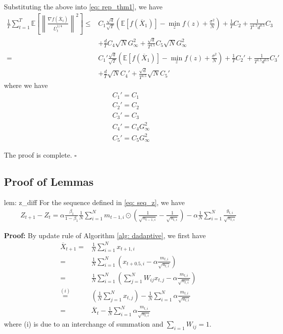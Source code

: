 \documentclass{article} %
\begin{document}
Substituting the above into \eqref{eq: rep_thm1}, we have 
\begin{align}\label{eq: sub_thm1}
\frac{1}{T}\sum_{t=1}^T  \mathbb E \left [\left\|\frac{\nabla f( \overline X_{t})}{\overline U_{t}^{1/4}}\right\|^2  \right]
\leq  & C_1 \frac{\sqrt{d}}{\sqrt{T}} \left(\mathbb E  [f( \overline X_{1})]  - \min_{z} f(z)  + \frac{\sigma^2}{N}\right)  +  \frac{ 1}{T} C_2    + \frac{1}{T^{1.5}d^{0.5}} C_3 \nonumber \\ 
&+   \frac{d}{T } C_4 \sqrt{N} G_{\infty}^2  + \frac{\sqrt{d}}{T^{1.5} } C_5  \sqrt{N} G_{\infty}^2 \nonumber \\
=  & C_1' \frac{\sqrt{d}}{\sqrt{T}} \left(\mathbb E  [f( \overline X_{1})]  - \min_{z} f(z)  + \frac{\sigma^2}{N}\right)  +  \frac{ 1}{T} C_2'    + \frac{1}{T^{1.5}d^{0.5}} C_3' \nonumber \\ 
&+   \frac{d}{T }\sqrt{N} C_4' + \frac{\sqrt{d}}{T^{1.5} } \sqrt{N} C_5'   
\end{align}
where we have 
\begin{align}
&C_1' = C_1 \nonumber \\
& C_2' = C_2\nonumber \\
& C_3' = C_3\nonumber \\
& C_4' = C_4G_{\infty}^2\nonumber \\
& C_5' = C_5 G_{\infty}^2 
\end{align}

The proof is complete. \hfill $\square$


\subsection{Proof of Lemmas} \label{app: proof_lemmas}
\begin{replemma}{lem: z_diff} For the sequence defined in \eqref{eq: seq_z}, we have
	\begin{align}\label{eq: update_z}
	Z_{t+1} - Z_t = \alpha \frac{\beta_1}{1-\beta_1}  \frac{1}{N} \sum_{i=1}^N m_{t-1	,i} \odot (\frac{1}{\sqrt{u_{t-1,i}}} - \frac{1}{\sqrt{u_{t,i}}}) - \alpha \frac{1}{N} \sum_{i=1}^N \frac{g_{t,i}}{\sqrt{u_{t,i}}}
	\end{align}
\end{replemma}

\textbf{Proof:} By update rule of Algorithm \ref{alg: dadaptive}, we first have
\begin{align}
\overline X_{t+1}  = & \frac{1}{N}\sum_{i=1}^N x_{t+1,i} \nonumber \\
= & \frac{1}{N}\sum_{i=1}^N \left( x_{t+0.5,i} - \alpha \frac{m_{t,i}}{\sqrt{u_{t,i}}}\right) \nonumber \\
= & \frac{1}{N}\sum_{i=1}^N \left(  \sum_{j=1}^N W_{ij}x_{t,j} - \alpha \frac{m_{t,i}}{\sqrt{u_{t,i}}}\right)   \nonumber \\
\overset{(i)}{=} &  \left(\frac{1}{N} \sum_{j=1}^N x_{t,j} \right) -\frac{1}{N} \sum_{i=1}^N   \alpha \frac{m_{t,i}}{\sqrt{u_{t,i}}} \nonumber \\
= & \overline X_t - \frac{1}{N} \sum_{i=1}^N   \alpha \frac{m_{t,i}}{\sqrt{u_{t,i}}}
\end{align}
where (i) is due to an interchange of summation and $\sum_{i=1} W_{ij} = 1$.
\end{document}
